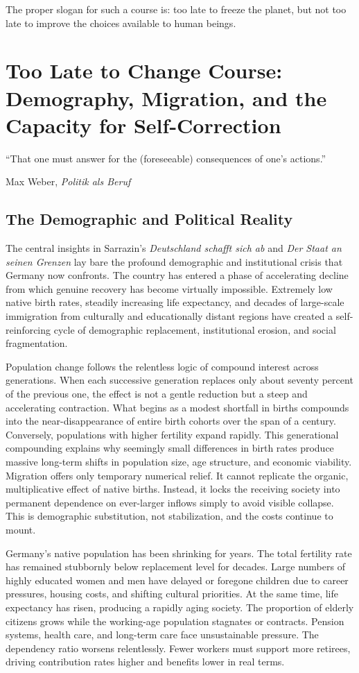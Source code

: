 ﻿\documentclass[12pt,a4paper]{book}
\begin{document}
The proper slogan for such a course is: too late to freeze the planet, but not too late to improve the choices available to human beings.



\chapter{Too Late to Change Course: Demography, Migration, and the Capacity for Self-Correction}

\epigraph{\enquote{That one must answer for the (foreseeable) consequences of one's actions.}}{Max Weber, \emph{Politik als Beruf}}

\section{The Demographic and Political Reality}

The central insights in Sarrazin's \emph{Deutschland schafft sich ab} and \emph{Der Staat an seinen Grenzen} lay bare the profound demographic and institutional crisis that Germany now confronts. The country has entered a phase of accelerating decline from which genuine recovery has become virtually impossible. Extremely low native birth rates, steadily increasing life expectancy, and decades of large-scale immigration from culturally and educationally distant regions have created a self-reinforcing cycle of demographic replacement, institutional erosion, and social fragmentation.

Population change follows the relentless logic of compound interest across generations. When each successive generation replaces only about seventy percent of the previous one, the effect is not a gentle reduction but a steep and accelerating contraction. What begins as a modest shortfall in births compounds into the near-disappearance of entire birth cohorts over the span of a century. Conversely, populations with higher fertility expand rapidly. This generational compounding explains why seemingly small differences in birth rates produce massive long-term shifts in population size, age structure, and economic viability. Migration offers only temporary numerical relief. It cannot replicate the organic, multiplicative effect of native births. Instead, it locks the receiving society into permanent dependence on ever-larger inflows simply to avoid visible collapse. This is demographic substitution, not stabilization, and the costs continue to mount.

Germany's native population has been shrinking for years. The total fertility rate has remained stubbornly below replacement level for decades. Large numbers of highly educated women and men have delayed or foregone children due to career pressures, housing costs, and shifting cultural priorities. At the same time, life expectancy has risen, producing a rapidly aging society. The proportion of elderly citizens grows while the working-age population stagnates or contracts. Pension systems, health care, and long-term care face unsustainable pressure. The dependency ratio worsens relentlessly. Fewer workers must support more retirees, driving contribution rates higher and benefits lower in real terms.
\end{document}
